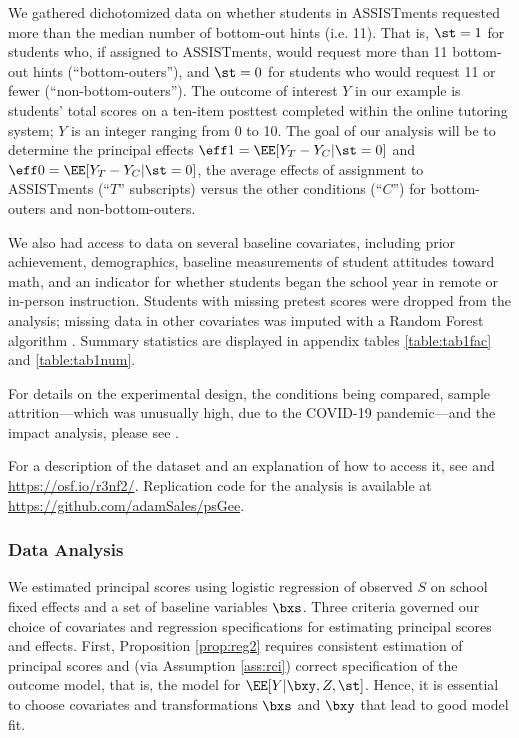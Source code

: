 \documentclass[]{article}
\begin{document}
\sloppy
We gathered dichotomized data on %
whether students in ASSISTments requested more than the median number of bottom-out hints (i.e. 11).
That is, $\st=1$ for students who, if assigned to ASSISTments, would request more than 11 bottom-out hints (``bottom-outers''), and $\st=0$ for students who would request 11 or fewer (``non-bottom-outers''). %
The outcome of interest $Y$ in our example is students' total scores on a ten-item posttest completed within the online tutoring system; $Y$ is an integer ranging from 0 to 10.
The goal of our analysis will be to determine the principal effects $\eff1=\EE[\yt-\yc|\st=0]$ and $\eff0=\EE[\yt-\yc|\st=0]$, the average effects of assignment to ASSISTments (``$T$'' subscripts) versus the other conditions (``$C$'') for bottom-outers and non-bottom-outers.

We also had access to data on several baseline covariates, including prior achievement, demographics, baseline measurements of student attitudes toward math, and an indicator for whether students began the school year in remote or in-person instruction.
Students with missing pretest scores were dropped from the analysis; missing data in other covariates was imputed with a Random Forest algorithm \citep{missForest}. Summary statistics are displayed in appendix tables \ref{table:tab1fac} and \ref{table:tab1num}.

For details on the experimental design, the conditions being compared, sample attrition---which was unusually high, due to the COVID-19 pandemic---and the impact analysis, please see \citet{impactPaper}.

For a description of the dataset and an explanation of how to access it, see \citet{ottmar2023data} and \url{https://osf.io/r3nf2/}.
Replication code for the analysis is available at %
\url{https://github.com/adamSales/psGee}.

\subsubsection{Data Analysis}
We estimated principal scores using logistic regression of observed $S$ on school fixed effects and a set of baseline variables $\bxs$.
Three criteria governed our choice of covariates and regression specifications for estimating principal scores and effects.
First, Proposition \ref{prop:reg2} requires consistent estimation of principal scores and (via Assumption \ref{ass:rci}) correct specification of the outcome model, that is, the model for $\EE[Y|\bxy,Z,\st]$.
Hence, it is essential to choose covariates and transformations $\bxs$ and $\bxy$ that lead to good model fit.
\end{document}
